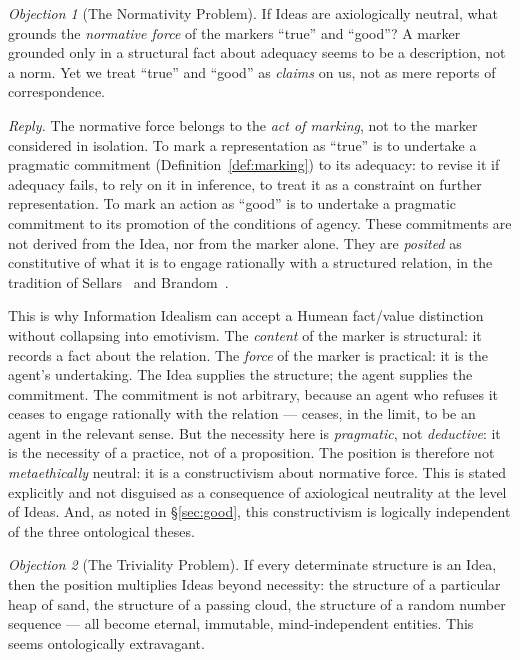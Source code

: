 \documentclass[11pt,a4paper]{article}
\theoremstyle{definition}
\theoremstyle{remark}
\newtheorem{objection}{Objection}[section]
\begin{document}
\begin{objection}[The Normativity Problem]
If Ideas are axiologically neutral, what grounds the \emph{normative
force} of the markers ``true'' and ``good''? A marker grounded only in
a structural fact about adequacy seems to be a description, not a
norm. Yet we treat ``true'' and ``good'' as \emph{claims} on us, not
as mere reports of correspondence.
\end{objection}

\noindent
\emph{Reply.} The normative force belongs to the \emph{act of
marking}, not to the marker considered in isolation. To mark a
representation as ``true'' is to undertake a pragmatic commitment
(Definition~\ref{def:marking}) to its adequacy: to revise it if
adequacy fails, to rely on it in inference, to treat it as a
constraint on further representation. To mark an action as ``good'' is
to undertake a pragmatic commitment to its promotion of the conditions
of agency. These commitments are not derived from the Idea, nor from
the marker alone. They are \emph{posited} as constitutive of what it
is to engage rationally with a structured relation, in the tradition
of Sellars~\cite{Sellars1956} and Brandom~\cite{Brandom1994}.

This is why Information Idealism can accept a Humean fact/value
distinction without collapsing into emotivism. The \emph{content} of
the marker is structural: it records a fact about the relation. The
\emph{force} of the marker is practical: it is the agent's undertaking.
The Idea supplies the structure; the agent supplies the commitment.
The commitment is not arbitrary, because an agent who refuses it
ceases to engage rationally with the relation --- ceases, in the
limit, to be an agent in the relevant sense. But the necessity here is
\emph{pragmatic}, not \emph{deductive}: it is the necessity of a
practice, not of a proposition. The position is therefore not
\emph{metaethically} neutral: it is a constructivism about normative
force. This is stated explicitly and not disguised as a consequence of
axiological neutrality at the level of Ideas. And, as noted in
\S\ref{sec:good}, this constructivism is logically independent of the
three ontological theses.

\begin{objection}[The Triviality Problem]
If every determinate structure is an Idea, then the position
multiplies Ideas beyond necessity: the structure of a particular heap
of sand, the structure of a passing cloud, the structure of a random
number sequence --- all become eternal, immutable, mind-independent
entities. This seems ontologically extravagant.
\end{objection}
\end{document}
